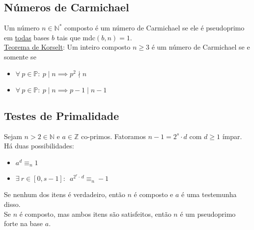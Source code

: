 \documentclass{article}
\begin{document}
\subsection{Números de Carmichael}
Um número $n \in \mathbb{N}^*$ composto é um número de Carmichael se ele é pseudoprimo em \uline{todas} bases $b$ tais que mdc$(b,n) = 1$. \\[10pt]
\uline{Teorema de Korselt}: Um inteiro composto $n \geq 3$ é um número de Carmichael se e somente se
\begin{itemize}
  \item $\forall\: p \in \mathbb{P}: \> p \mid n \implies p^2 \nmid n$
  \item $\forall\: p \in \mathbb{P}: \> p \mid n \implies p - 1 \mid n - 1$
\end{itemize}

\subsection{Testes de Primalidade}
Sejam $n > 2 \in \mathbb{N}$ e $a \in \mathbb{Z}$ co-primos. Fatoramos $n - 1 = 2^s \cdot d$ com $d \geq 1$ ímpar. Há duas possibilidades:
\begin{itemize}
  \item $a^d \equiv_n 1$
  \item $\exists\: r \in [0, s - 1]:\enspace a^{2^r \cdot\, d} \equiv_n -1$
\end{itemize}
Se nenhum dos itens é verdadeiro, então $n$ é composto e $a$ é uma testemunha disso. \\[5pt]
Se $n$ é composto, mas ambos itens são satisfeitos, então $n$ é um pseudoprimo forte na base $a$.
\end{document}
